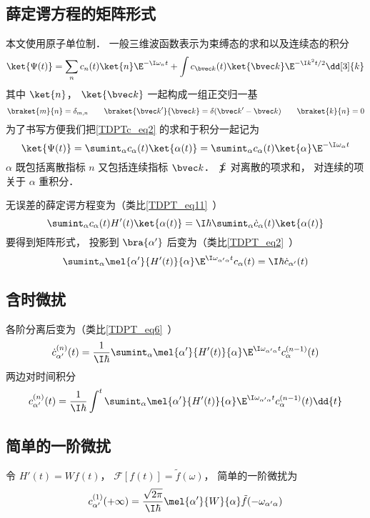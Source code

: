 

\subsection{薛定谔方程的矩阵形式}
本文使用原子单位制． 一般三维波函数表示为束缚态的求和以及连续态的积分
\begin{equation}\label{TDPTc_eq2}
\ket{\Psi(t)} = \sum_n c_n(t)\ket{n}\E^{-\I\omega_n t} + \int c_{\bvec k}(t)\ket{\bvec k}\E^{-\I k^2 t/2} \dd[3]{k}
\end{equation}
其中 $\ket{n}$， $\ket{\bvec k}$ 一起构成一组正交归一基
\begin{equation}
\braket{m}{n} = \delta_{m,n} \qquad
\braket{\bvec k'}{\bvec k} = \delta(\bvec k' - \bvec k) \qquad
\braket{k}{n} = 0
\end{equation}
为了书写方便我们把\autoref{TDPTc_eq2} 的求和于积分一起记为
\begin{equation}
\ket{\Psi(t)} = \sumint_\alpha c_\alpha(t) \ket{\alpha(t)} = \sumint_\alpha c_\alpha(t) \ket{\alpha}\E^{-\I\omega_\alpha t} 
\end{equation}
$\alpha$ 既包括离散指标 $n$ 又包括连续指标 $\bvec k$． $\sumint$ 对离散的项求和， 对连续的项关于 $\alpha$ 重积分．

无误差的薛定谔方程变为（类比\autoref{TDPT_eq11}~）
\begin{equation}
\sumint_\alpha c_\alpha(t) H'(t) \ket{\alpha(t)} = \I \hbar \sumint_\alpha \dot c_\alpha(t) \ket{\alpha(t)}
\end{equation}
要得到矩阵形式， 投影到 $\bra{\alpha'}$ 后变为（类比\autoref{TDPT_eq2}~）
\begin{equation}
\sumint_\alpha \mel{\alpha'}{H'(t)}{\alpha} \E^{\I \omega_{\alpha'\alpha} t} c_\alpha(t)
= \I \hbar \dot c_{\alpha'} (t)
\end{equation}

\subsection{含时微扰}
各阶分离后变为（类比\autoref{TDPT_eq6}~）
\begin{equation}
\dot c_{\alpha'}^{(n)}(t) = \frac{1}{\I\hbar} \sumint_\alpha \mel{\alpha'}{H'(t)}{\alpha} \E^{\I \omega_{\alpha'\alpha} t} c_{\alpha}^{(n-1)}(t)
\end{equation}
两边对时间积分
\begin{equation}
c_{\alpha'}^{(n)}(t) = \frac{1}{\I\hbar} \int^t \sumint_\alpha \mel{\alpha'}{H'(t)}{\alpha} \E^{\I \omega_{\alpha'\alpha} t} c_{\alpha}^{(n-1)}(t) \dd{t}
\end{equation}

\subsection{简单的一阶微扰}
令 $H'(t) = W f(t)$， $\mathcal F[f(t)] = \tilde f(\omega)$， 简单的一阶微扰为
\begin{equation}\label{TDPTc_eq1}
c_{\alpha'}^{(1)}(+\infty) = \frac{\sqrt{2\pi}}{\I\hbar} \mel{\alpha'}{W}{\alpha} \tilde f(-\omega_{\alpha'\alpha})
\end{equation}

